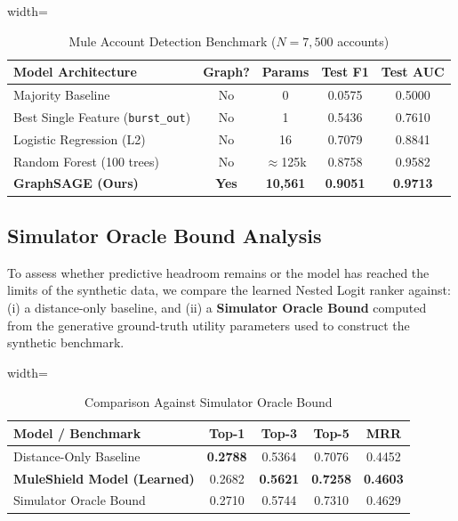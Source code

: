\documentclass[conference]{IEEEtran}
\begin{document}
\begin{table}[htbp]
\caption{Mule Account Detection Benchmark ($N=7,500$ accounts)}
\label{tab:mule_detection}
\centering
\begin{adjustbox}{width=\columnwidth}
\begin{tabular}{lcccc}
\toprule
\textbf{Model Architecture} & \textbf{Graph?} & \textbf{Params} & \textbf{Test F1} & \textbf{Test AUC} \\
\midrule
Majority Baseline & No & 0 & 0.0575 & 0.5000 \\
Best Single Feature (\texttt{burst\_out}) & No & 1 & 0.5436 & 0.7610 \\
Logistic Regression (L2) & No & 16 & 0.7079 & 0.8841 \\
Random Forest (100 trees) & No & $\approx$125k & 0.8758 & 0.9582 \\
\textbf{GraphSAGE (Ours)} & \textbf{Yes} & \textbf{10,561} & \textbf{0.9051} & \textbf{0.9713} \\
\bottomrule
\end{tabular}
\end{adjustbox}
\end{table}

\subsection{Simulator Oracle Bound Analysis}
To assess whether predictive headroom remains or the model has reached the limits of the synthetic data, we compare the learned Nested Logit ranker against: (i) a distance-only baseline, and (ii) a \textbf{Simulator Oracle Bound} computed from the generative ground-truth utility parameters used to construct the synthetic benchmark.

\begin{table}[htbp]
\caption{Comparison Against Simulator Oracle Bound}
\label{tab:oracle_bound}
\centering
\begin{adjustbox}{width=\columnwidth}
\begin{tabular}{lcccc}
\toprule
\textbf{Model / Benchmark} & \textbf{Top-1} & \textbf{Top-3} & \textbf{Top-5} & \textbf{MRR} \\
\midrule
Distance-Only Baseline & \textbf{0.2788} & 0.5364 & 0.7076 & 0.4452 \\
\textbf{MuleShield Model (Learned)} & 0.2682 & \textbf{0.5621} & \textbf{0.7258} & \textbf{0.4603} \\
Simulator Oracle Bound & 0.2710 & 0.5744 & 0.7310 & 0.4629 \\
\bottomrule
\end{tabular}
\end{adjustbox}
\end{table}
\end{document}
